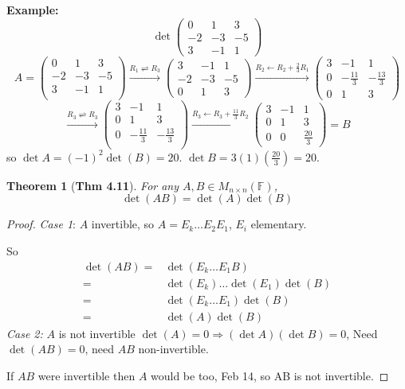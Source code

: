 \documentclass[12pt]{article}
\newtheorem{theorem}{Theorem}[subsection]
\newcommand{\mF}{{\mathbb{F}}}
\begin{document}
{\color{Brown}
	\textbf{Example: }
	\[
		\det 
		\begin{pmatrix}
			0 & 1 & 3	\\
			-2 & -3 & -5	\\
			3 & -1 & 1
		\end{pmatrix}
	\]
	\[
		A = 
		\begin{pmatrix}
			0 & 1 & 3	\\
			-2 & -3 & -5\\
			3 & -1 & 1	\\
		\end{pmatrix}
		\overset{R_1 \rightleftharpoons R_3}{\longrightarrow}
		\begin{pmatrix}
			3 & -1 & 1	\\
			-2 & -3	& -5	\\
			0 & 1 & 3
		\end{pmatrix}
		\overset{R_2 \leftarrow R_2 + \frac 23 R_1}{\longrightarrow}
		\begin{pmatrix}
			3 & -1 & 1	\\
			0 & -\frac{11}3 & -\frac{13}3	\\
			0 & 1 & 3
		\end{pmatrix}
	\]
	\[
		\overset{R_3 \rightleftharpoons R_3}{\longrightarrow} 
		\begin{pmatrix}
			3 & -1 & 1	\\
			0 & 1 & 3	\\
			0 & -\frac{11}3 & -\frac{13}3	\\
		\end{pmatrix}
		\overset{R_3 \leftarrow R_3+\frac{11}3R_2}{\longrightarrow}
		\begin{pmatrix}
			3 & -1 & 1	\\
			0 & 1 & 3	\\
			0 & 0 & \frac{20}3 
		\end{pmatrix} = B
	\]
	so $\det A = (-1)^2 \det (B) = 20$. 
	$\det B = 3(1)(\frac{20}3) = 20$. 
}



\begin{theorem}[\textbf{Thm 4.11}]
	For any $A, B \in M_{n\times n}(\mF)$, 
	\[
		\det (AB) = \det (A) \det (B) 
	\]
\end{theorem}
\begin{proof}
	\textit{Case 1}:
	$A$ invertible, so $A = E_k \ldots E_2 E_1$, $E_i$ elementary. 

	So 
	\begin{align*}
		\det (AB) 
		=& \det (E_k \ldots E_1 B)	\\
		=& \det (E_k) \ldots \det(E_1) \det (B)	\tag{By *}\\
		=& \det(E_k \ldots E_1) \det(B)	\tag{By **}\\
		=& \det (A) \det(B)
	\end{align*}
	\textit{Case 2:} 
	$A$ is not invertible $\det(A) = 0 \Rightarrow (\det A) (\det B) = 0$, 
	Need $\det(AB) = 0$, need $AB$ non-invertible. 
	
	If $AB$ were invertible then $A$ would be too, Feb 14, so AB is not 
	invertible. 

\end{proof}
\end{document}
